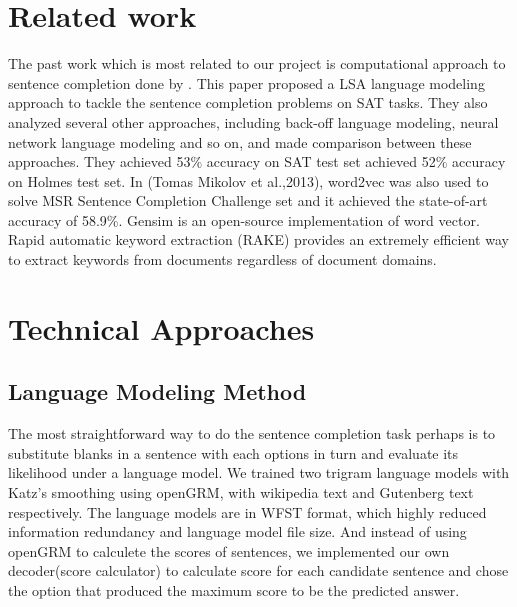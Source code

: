 \documentclass[11pt]{article}
\begin{document}
\section{Related work}
The past work which is most related to our project is computational approach to sentence completion done by \cite{Aho:72}. This paper proposed a LSA language modeling approach to tackle the sentence completion problems on SAT tasks. They also analyzed several other approaches, including back-off language modeling, neural network language modeling and so on, and made comparison between these approaches. They achieved 53$\%$ accuracy on SAT test set achieved 52$\%$ accuracy on Holmes test set. In (Tomas Mikolov et al.,2013), word2vec was also used to solve MSR Sentence Completion Challenge set and it achieved the state-of-art accuracy of 58.9$\%$. Gensim \cite{Gusfield:97} is an open-source implementation of word vector. Rapid automatic keyword extraction (RAKE) provides an extremely efficient way to extract keywords from documents regardless of document domains. 

\section{Technical Approaches}
\subsection{Language Modeling Method}
The most straightforward way to do the sentence completion task perhaps is to substitute blanks in a sentence with each options in turn and evaluate its likelihood under a language model. We trained two trigram language models with Katz's smoothing using openGRM\cite{ACL:97}, with wikipedia text and Gutenberg text respectively. The language models are in WFST format, which highly reduced information redundancy and language model file size. And instead of using openGRM to calculete the scores of sentences, we implemented our own decoder(score calculator) to calculate score for each candidate sentence and chose the option that produced the maximum score to be the predicted answer. 
\end{document}
